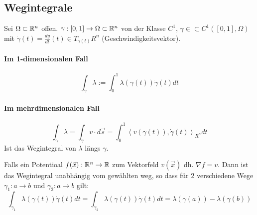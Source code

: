 \documentclass[a4paper]{article}
\begin{document}
	\subsection{Wegintegrale}
		Sei $\Omega \subset \mathbb{R}^n$ offen. $\gamma: [0,1] \rightarrow \Omega \subset \mathbb{R}^n$ von der Klasse $C^1$, $\gamma \in \subset C^1([0,1], \Omega)$ mit $\dot{\gamma} (t) = \frac{dy}{dt}(t) \in T_{\gamma(t)}R^n$ (Geschwindigkeitsvektor). 
		\begin{fdef}[Wegintegral]
			\paragraph{Im 1-dimensionalen Fall}
				$$ \int_\gamma \lambda := \int_0^1 \lambda(\gamma(t))\dot{\gamma}(t) dt$$ 
			\paragraph{Im mehrdimensionalen Fall}
				$$ \int_\gamma \lambda = \int_\gamma v \cdot d \vec s = \int_0^1 \left\langle v(\gamma(t)), \dot \gamma(t) \right\rangle_{R^n} dt$$
			Ist das Wegintegral von $\lambda$ längs $\gamma$.
		\end{fdef}
		
		\begin{fmerke}
		Falls ein Potentioal $f(\vec x): \mathbb{R}^n \rightarrow \mathbb{R}$ zum Vektorfeld $v(\vec x)$ dh. $\nabla f = v$. Dann ist das Wegintegral unabhängig vom gewählten weg, so dass für 2 verschiedene Wege $\gamma_1:a \rightarrow b$ und $\gamma_2:a \rightarrow b$ gilt:
		$$ \int_{\gamma_1} \lambda(\gamma(t))\dot{\gamma}(t) dt = \int_{\gamma_2} \lambda(\gamma(t))\dot{\gamma}(t) dt = \lambda(\gamma(a))-\lambda(\gamma(b))$$
		\end{fmerke}
		
\end{document}
